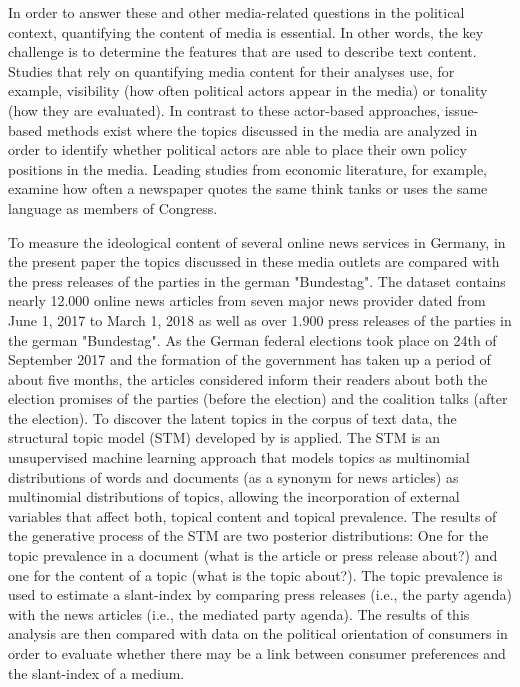 \documentclass[12pt,a4paper,notitlepage]{article}
\begin{document}
In order to answer these and other media-related questions in the political context, quantifying the content of media is essential. In other words, the key challenge is to determine the features that are used to describe text content. Studies that rely on quantifying media content for their analyses use, for example, visibility (how often political actors appear in the media) or tonality (how they are evaluated). In contrast to these actor-based approaches, issue-based methods exist where the topics discussed in the media are analyzed in order to identify whether political actors are able to place their own policy positions in the media. Leading studies from economic literature, for example, examine how often a newspaper quotes the same think tanks \citep{groseclose_measure_2005, lott_is_2014} or uses the same language \citep{gentzkow_media_2004} as members of Congress. 

To measure the ideological content of several online news services in Germany, in the present paper the topics discussed in these media outlets are compared with the press releases of the parties in the german "Bundestag". The dataset contains nearly 12.000 online news articles from seven major news provider dated from June 1, 2017 to March 1, 2018 as well as over 1.900 press releases of the parties in the german "Bundestag". As the German federal elections took place on 24th of September 2017 and the formation of the government has taken up a period of about five months, the articles considered inform their readers about both the election promises of the parties (before the election) and the coalition talks (after the election). To discover the latent topics in the corpus of text data, the structural topic model (STM) developed by \citet{roberts_model_2016} is applied. The STM is an unsupervised machine learning approach that models topics as multinomial distributions of words and documents (as a synonym for news articles) as multinomial distributions of topics, allowing the incorporation of external variables that affect both, topical content and topical prevalence. The results of the generative process of the STM are two posterior distributions: One for the topic prevalence in a document (what is the article or press release about?) and one for the content of a topic (what is the topic about?). The topic prevalence is used to estimate a slant-index by comparing press releases (i.e., the party agenda) with the news articles (i.e., the mediated party agenda). The results of this analysis are then compared with data on the political orientation of consumers in order to evaluate whether there may be a link between consumer preferences and the slant-index of a medium. 
\end{document}

